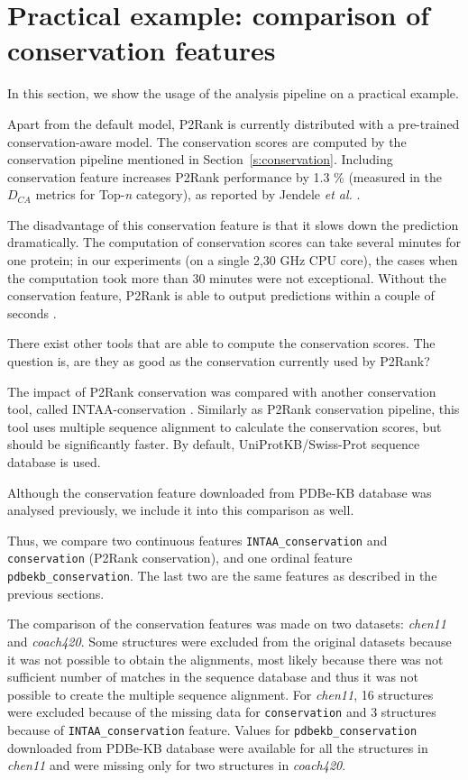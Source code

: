 \newpage
\section{Practical example: comparison of \newline conservation features}

In this section, we show the usage of the analysis pipeline on a practical example.

Apart from the default model, P2Rank is currently distributed with a pre-trained conservation-aware model. The conservation scores are computed by the conservation pipeline mentioned in Section~\ref{s:conservation}. Including conservation feature increases P2Rank performance by 1.3 \% (measured in the $D_{CA}$ metrics for Top-\textit{n} category), as reported by Jendele \textit{et al.} \cite{prankweb}.

The disadvantage of this conservation feature is that it slows down the prediction dramatically. The computation of conservation scores can take several minutes for one protein; in our experiments (on a single 2,30 GHz CPU core), the cases when the computation took more than 30 minutes were not exceptional. Without the conservation feature, P2Rank is able to output predictions within a couple of seconds \cite{p2rank1}.

There exist other tools that are able to compute the conservation scores. The question is, are they as good as the conservation currently used by P2Rank?

The impact of P2Rank conservation was compared with another conservation tool, called INTAA-conservation \cite{intaa_github}. Similarly as P2Rank conservation pipeline, this tool uses multiple sequence alignment to calculate the conservation scores, but should be significantly faster. By default, UniProtKB/Swiss-Prot sequence database \cite{swissprot} is used.

Although the conservation feature downloaded from PDBe-KB database was analysed previously, we include it into this comparison as well.

Thus, we compare two continuous features \texttt{INTAA\_conservation} and \texttt{conservation} (P2Rank conservation), and one ordinal feature \texttt{pdbekb\_conservation}. The last two are the same  features as described in the previous sections.

The comparison of the conservation features was made on two datasets: \textit{chen11} and \textit{coach420}. Some structures were excluded from the original datasets because it was not possible to obtain the alignments, most likely because there was not sufficient number of matches in the sequence database and thus it was not possible to create the multiple sequence alignment. For \textit{chen11}, 16 structures were excluded because of the missing data for \texttt{conservation} and 3 structures because of \texttt{INTAA\_conservation} feature. Values for \texttt{pdbekb\_conservation} downloaded from PDBe-KB database were available for all the structures in \textit{chen11} and were missing only for two structures in \textit{coach420}. 

